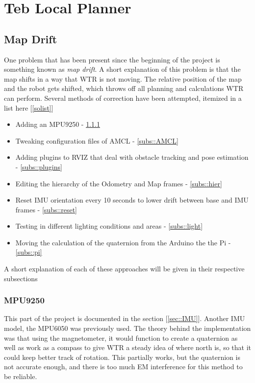 \section{Teb Local Planner}


\subsection{Map Drift}
One problem that has been present since the beginning of the project is something known as \textit{map drift}.
A short explanation of this problem is that the map shifts in a way that WTR is not moving.
The relative position of the map and the robot gets shifted, which throws off all planning and calculations WTR can perform.
Several methods of correction have been attempted, itemized in a list here [\ref{solist}]
\begin{itemize}
\label{solist}
\item Adding an MPU9250 - \ref{subs::mpu}
\item Tweaking configuration files of AMCL - \ref{subs::AMCL}
\item Adding plugins to RVIZ that deal with obstacle tracking and pose estimation - \ref{subs::plugins}
\item Editing the hierarchy of the Odometry and Map frames - \ref{subs::hier}
\item Reset IMU orientation every 10 seconds to lower drift between base and IMU frames - \ref{subs::reset}
\item Testing in different lighting conditions and areas - \ref{subs::light}
\item Moving the calculation of the quaternion from the Arduino the the Pi - \ref{subs::pi}
\end{itemize}
A short explanation of each of these approaches will be given in their respective subsections

\subsubsection{MPU9250}
\label{subs::mpu}
This part of the project is documented in the section [\ref{sec::IMU}].
Another IMU model, the MPU6050 was previously used.
The theory behind the implementation was that using the magnetometer, it would function to create a quaternion as well as work as a compass to give WTR a steady idea of where north is, so that it could keep better track of rotation.
This partially works, but the quaternion is not accurate enough, and there is too much EM interference for this method to be reliable.

